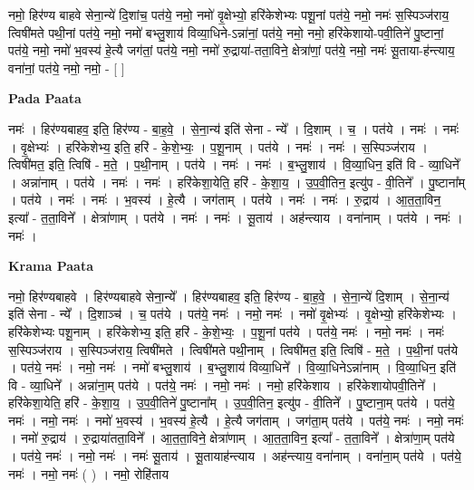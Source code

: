 \documentclass[17pt]{extarticle}
\begin{document}
नमो॒ हिर॑ण्य बाहवे सेना॒न्ये॑ दि॒शांच॒ पत॑ये॒ नमो॒                        नमो॑ वृ॒क्षेभ्यो॒ हरि॑केशेभ्यः पशू॒नां पत॑ये॒ नमो॒                नमः॑ स॒स्पिञ्ज॑राय॒ त्विषी॑मते पथी॒नां पत॑ये॒ नमो॒                    नमो॑ बभ्लु॒शाय॑ विव्या॒धिने-ऽन्ना॑नां॒ पत॑ये॒ नमो॒                  नमो॒ हरि॑केशायो-पवी॒तिने॑ पु॒ष्टानां॒ पत॑ये॒ नमो॒                                 नमो॑ भ॒वस्य॑ हे॒त्यै जग॑तां॒ पत॑ये॒ नमो॒                                                नमो॑ रु॒द्राया॑-तता॒विने॒ क्षेत्रा॑णां॒ पत॑ये॒ नमो॒                          नमः॑ सू॒ताया-ह॑न्त्याय॒ वना॑नां॒ पत॑ये॒ नमो॒ नमो॒ - [  ] \newline

\textbf{Pada Paata} \newline

नमः॑ । हिर॑ण्यबाहव॒ इति॒ हिर॑ण्य - बा॒ह॒वे॒ । से॒ना॒न्य॑ इति॑ सेना - न्ये᳚ । दि॒शाम् । च॒ । पत॑ये । नमः॑ । नमः॑ । वृ॒क्षेभ्यः॑ । हरि॑केशेभ्य॒ इति॒ हरि॑ - के॒शे॒भ्यः॒ । प॒शू॒नाम् । पत॑ये । नमः॑ । नमः॑ । स॒स्पिञ्ज॑राय । त्विषी॑मत॒ इति॒ त्विषि॑ - म॒ते॒ । प॒थी॒नाम् । पत॑ये । नमः॑ । नमः॑ । ब॒भ्लु॒शाय॑ । वि॒व्या॒धिन॒ इति॑ वि - व्या॒धिने᳚ । अन्ना॑नाम् । पत॑ये । नमः॑ । नमः॑ । हरि॑केशा॒येति॒ हरि॑ - के॒शा॒य॒ । उ॒प॒वी॒तिन॒ इत्यु॑प - वी॒तिने᳚ । पु॒ष्टाना᳚म् । पत॑ये । नमः॑ । नमः॑ । भ॒वस्य॑ । हे॒त्यै । जग॑ताम् । पत॑ये । नमः॑ । नमः॑ । रु॒द्राय॑ । आ॒त॒ता॒विन॒ इत्या᳚ - त॒ता॒विने᳚ । क्षेत्रा॑णाम् । पत॑ये । नमः॑ । नमः॑ । सू॒ताय॑ । अह॑न्त्याय । वना॑नाम् । पत॑ये । नमः॑ । नमः॑ ।  \newline


\textbf{Krama Paata} \newline

नमो॒ हिर॑ण्यबाहवे । हिर॑ण्यबाहवे सेना॒न्ये᳚ । हिर॑ण्यबाहव॒ इति॒ हिर॑ण्य - बा॒ह॒वे॒ । से॒ना॒न्ये॑ दि॒शाम् । से॒ना॒न्य॑ इति॑ सेना - न्ये᳚ । दि॒शाञ्च॑ । च॒ पत॑ये । पत॑ये॒ नमः॑ । नमो॒ नमः॑ । नमो॑ वृ॒क्षेभ्यः॑ । वृ॒क्षेभ्यो॒ हरि॑केशेभ्यः । हरि॑केशेभ्यः पशू॒नाम् । हरि॑केशेभ्य॒ इति॒ हरि॑ - के॒शे॒भ्यः॒ । प॒शू॒नां पत॑ये । पत॑ये॒ नमः॑ । नमो॒ नमः॑ । नमः॑ स॒स्पिञ्ज॑राय । स॒स्पिञ्ज॑राय॒ त्विषी॑मते । त्विषी॑मते पथी॒नाम् । त्विषी॑मत॒ इति॒ त्विषि॑ - म॒ते॒ । प॒थी॒नां पत॑ये । पत॑ये॒ नमः॑ । नमो॒ नमः॑ । नमो॑ बभ्लु॒शाय॑ । ब॒भ्लु॒शाय॑ विव्या॒धिने᳚ । वि॒व्या॒धिनेऽन्ना॑नाम् । वि॒व्या॒धिन॒ इति॑ वि - व्या॒धिने᳚ । अन्ना॑ना॒म् पत॑ये । पत॑ये॒ नमः॑ । नमो॒ नमः॑ । नमो॒ हरि॑केशाय । हरि॑केशायोपवी॒तिने᳚ । हरि॑केशा॒येति॒ हरि॑ - के॒शा॒य॒ । उ॒प॒वी॒तिने॑ पु॒ष्टाना᳚म् । उ॒प॒वी॒तिन॒ इत्यु॑प - वी॒तिने᳚ । पु॒ष्टाना॒म् पत॑ये । पत॑ये॒ नमः॑ । नमो॒ नमः॑ । नमो॑ भ॒वस्य॑ । भ॒वस्य॑ हे॒त्यै । हे॒त्यै जग॑ताम् । जग॑ता॒म् पत॑ये । पत॑ये॒ नमः॑ । नमो॒ नमः॑ । नमो॑ रु॒द्राय॑ । रु॒द्राया॑तता॒विने᳚ । आ॒त॒ता॒विने॒ क्षेत्रा॑णाम् । आ॒त॒ता॒विन॒ इत्या᳚ - त॒ता॒विने᳚ । क्षेत्रा॑णा॒म् पत॑ये । पत॑ये॒ नमः॑ । नमो॒ नमः॑ । नमः॑ सू॒ताय॑ । सू॒तायाह॑न्त्याय । अह॑न्त्याय॒ वना॑नाम् । वना॑ना॒म् पत॑ये । पत॑ये॒ नमः॑ । नमो॒ नमः॑ ( ) । नमो॒ रोहि॑ताय \newline
\end{document}

